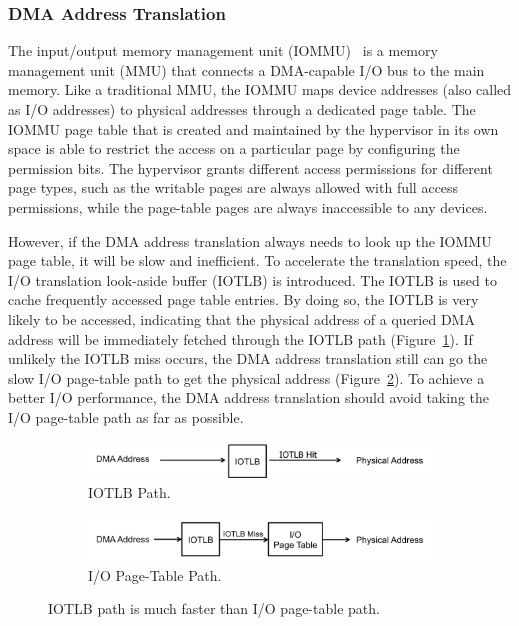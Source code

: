 \subsubsection{DMA Address Translation}
The input/output memory management unit (IOMMU)~\cite{intelvt} is a memory management unit (MMU) that connects a DMA-capable I/O bus to the main memory.
Like a traditional MMU, the IOMMU maps device addresses (also called as I/O addresses) to physical addresses through a dedicated page table.
The IOMMU page table that is created and maintained by the hypervisor in its own space is able to restrict the access on a particular page by configuring the permission bits.
The hypervisor grants different access permissions for different page types, such as the writable pages are always allowed with full access permissions, while the page-table pages are always inaccessible to any devices.

However, if the DMA address translation always needs to look up the IOMMU page table, it will be slow and inefficient.
To accelerate the translation speed, the I/O translation look-aside buffer (IOTLB) is introduced.
The IOTLB is used to cache frequently accessed page table entries.
By doing so, the IOTLB is very likely to be accessed, indicating that the physical address of a queried DMA address will be immediately fetched through the IOTLB path (Figure~\ref{fig:iotlbpath}).
If unlikely the IOTLB miss occurs, the DMA address translation still can go the slow I/O page-table path to get the physical address (Figure~\ref{fig:ioptpath}).
To achieve a better I/O performance, the DMA address translation should avoid taking the I/O page-table path as far as possible.

\begin{figure}[!t]
    \begin{subfigure}{0.45\textwidth}
        \includegraphics[width=1\textwidth]{image/background/DMA-IOTLB-translation.png}
        \caption{\centering IOTLB Path.}
        \label{fig:iotlbpath}
    \end{subfigure}
    \vfill
    \begin{subfigure}{0.45\textwidth}
        \includegraphics[width=1\textwidth]{image/background/DMA-pt-translation.png}
        \caption{\centering I/O Page-Table Path.}
        \label{fig:ioptpath}
    \end{subfigure}
    \caption{IOTLB path is much faster than I/O page-table path.}
    \label{fig:dma-add-trans}
\end{figure}


